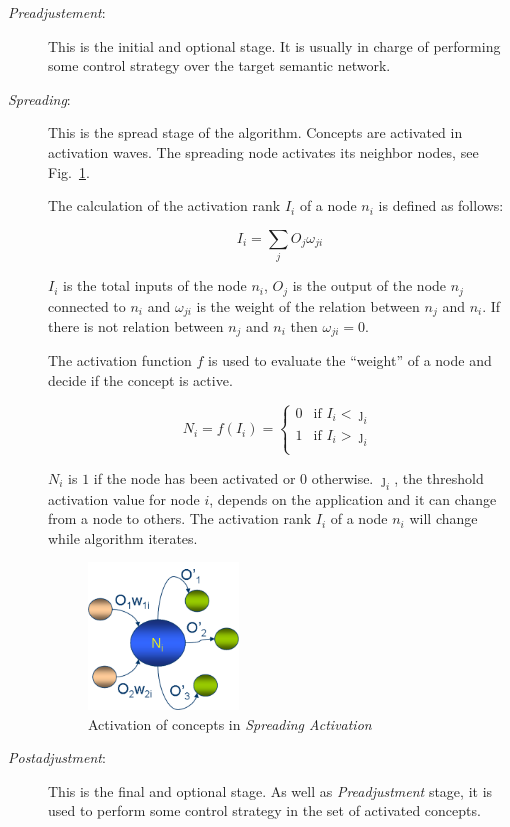 \begin{description}
\item [\textit{Preadjustement}:] This is the initial and optional stage. It is usually in charge
of performing some control strategy over the target semantic network.
\medskip

\item [\textit{Spreading}:] This is the spread stage of the algorithm. Concepts
are activated in activation waves. The spreading node activates its neighbor
nodes, see Fig.~\ref{fig:modelo-sa}.
\medskip

The calculation of the activation rank $I_i$ of a node $n_i$ is defined as
follows:

\begin{equation}
I_i  = \sum_j{O_j \omega_{ji}}
\end{equation}
\medskip

$I_i$ is the total inputs of the node $n_i$, $O_j$
is the output of the node $n_j$ connected to $n_i$ and $\omega_{ji}$
is the weight of the relation between $n_j$ and $n_i$. 
If there is not relation between $n_j$ and $n_i$ then
$\omega_{ji} = 0$. 


The activation function $f$ is used to evaluate the ``weight'' of a node and
decide if the concept is active.


\begin{equation}
N_i=f(I_i)=\begin{cases} 0 & \text{if $I_i < \jmath_i$} \\ 1 &
\text{if $I_i > \jmath_i$}
\\ \end{cases}
\end{equation}


$N_i$ is $1$ if the node has been activated or 0 otherwise. 
$\jmath_i$, the threshold activation value for node $i$, depends on the application
and it can change from a node to others. The activation rank $I_i$ of a
node $n_i$ will change while algorithm iterates.

\begin{figure}[h]
 \centering
 \includegraphics[width=4cm]{images/modelo-sa}
    \caption{Activation of concepts in \textit{Spreading Activation}}
 \label{fig:modelo-sa}
\end{figure}

\item [\textit{Postadjustment}:] This is the final and optional stage. As well as
\textit{Preadjustment} stage, it is used to perform some control strategy in the
set of activated concepts.

\end{description}
